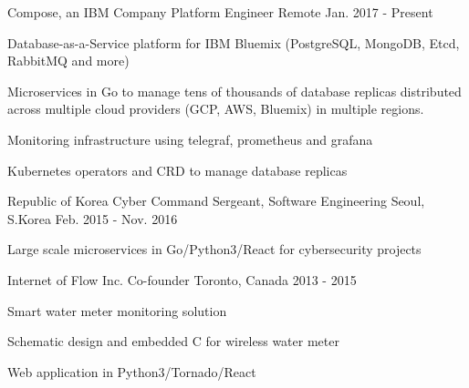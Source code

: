 

\begin{cventries}

  \cventry
    {Compose, an IBM Company} %
    {Platform Engineer} %
    {Remote} %
    {Jan. 2017 - Present} %
    {
      \begin{cvitems} %
        \item {Database-as-a-Service platform for IBM Bluemix (PostgreSQL, MongoDB, Etcd, RabbitMQ and more)}
        \item {Microservices in Go to manage tens of thousands of database replicas distributed across multiple cloud providers (GCP, AWS, Bluemix) in multiple regions.}
        \item {Monitoring infrastructure using telegraf, prometheus and grafana}
        \item {Kubernetes operators and CRD to manage database replicas}
      \end{cvitems}
    }

  \cventry
    {Republic of Korea Cyber Command} %
    {Sergeant, Software Engineering} %
    {Seoul, S.Korea} %
    {Feb. 2015 - Nov. 2016} %
    {
      \begin{cvitems} %
        \item {Large scale microservices in Go/Python3/React for cybersecurity projects}
      \end{cvitems}
    }

  \cventry
    {Internet of Flow Inc.} %
    {Co-founder} %
    {Toronto, Canada} %
    {2013 - 2015} %
    {
      \begin{cvitems} %
        \item {Smart water meter monitoring solution}
        \item {Schematic design and embedded C for wireless water meter}
        \item {Web application in Python3/Tornado/React}
      \end{cvitems}
    }


\end{cventries}
